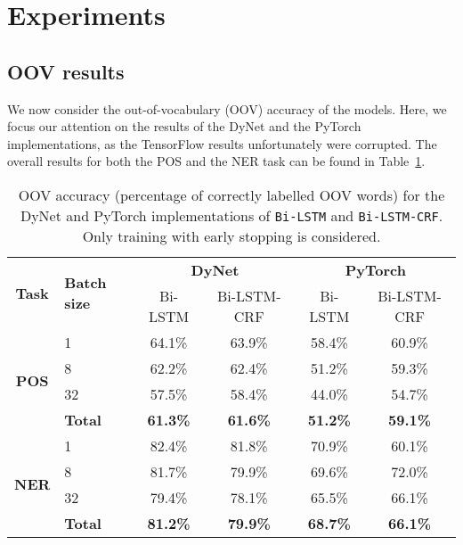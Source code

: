 
\section{Experiments}\label{sec:experiments}




\subsection{OOV results}

We now consider the out-of-vocabulary (OOV) accuracy of the models. Here, we
focus our attention on the results of the DyNet and the PyTorch implementations,
as the TensorFlow results unfortunately were corrupted. The overall results for
both the POS and the NER task can be found in
Table~\ref{table:oov-accuracy-total}.

\begin{table}[h!]
    \centering
    \begin{tabular}{c l c c|c c}
     \toprule
       \multirow{2}{*}{\bfseries Task}
     & \multirow{2}{*}{\bfseries Batch size}
     & \multicolumn{2}{c}{\bfseries DyNet}
     & \multicolumn{2}{c}{\bfseries PyTorch} \\

      \cmidrule(lr){3-6}
     && Bi-LSTM  & Bi-LSTM-CRF & Bi-LSTM  & Bi-LSTM-CRF \\ 

      \cmidrule(lr){1-6}
      \multirow{4}{*}{\textbf{POS}}
      &  1 & 64.1\% & 63.9\%  & 58.4\% & 60.9\%  \\
      &  8 & 62.2\% & 62.4\%  & 51.2\% & 59.3\%  \\
      & 32 & 57.5\% & 58.4\%  & 44.0\% & 54.7\%  \\ \cmidrule(lr){2-6}
      & \textbf{Total} &
      \textbf{61.3\%} & \textbf{61.6\%}  & \textbf{51.2\%} & \textbf{59.1\%} \\

      \cmidrule(lr){1-6}
      \multirow{4}{*}{\textbf{NER}}
     &  1 & 82.4\% & 81.8\%  & 70.9\% & 60.1\%  \\
     &  8 & 81.7\% & 79.9\%  & 69.6\% & 72.0\%  \\
     & 32 & 79.4\% & 78.1\%  & 65.5\% & 66.1\%  \\ \cmidrule(lr){2-6}
     & \textbf{Total} &
      \textbf{81.2\%} & \textbf{79.9\%}  & \textbf{68.7\%} & \textbf{66.1\%} \\

     \bottomrule
    \end{tabular}
    \caption{OOV accuracy (percentage of correctly labelled OOV words) for the DyNet
        and PyTorch implementations of \texttt{Bi-LSTM} and
        \texttt{Bi-LSTM-CRF}. Only training with early stopping is considered. 
    }\label{table:oov-accuracy-total}
\end{table}

